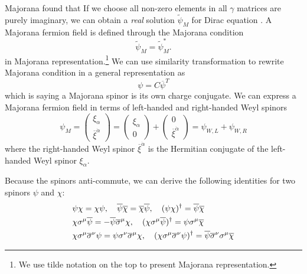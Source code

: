 \documentclass[12pt]{report}
\begin{document}
Majorana found that If we choose all non-zero elements in all $\gamma$ matrices are purely imaginary, we can obtain a \textit{real} solution $\widetilde{\psi}_{M}$ for Dirac equation \cite{majorana}.
A Majorana fermion field is defined through the Majorana condition
\begin{equation}
\widetilde{\psi}_{M} = \widetilde{\psi}^{*}_{M} .
\end{equation}
in Majorana representation.\footnote{We use tilde notation on the top to present Majorana representation.}
We can use similarity transformation to rewrite Majorana condition in a general representation as
\begin{equation}
\psi = C \overline{\psi}^{T}
\end{equation}
which is saying a Majorana spinor is its own charge conjugate.
We can express a Majorana fermion field in terms of left-handed and right-handed Weyl spinors
\begin{equation}
\psi_{M} = \left( \begin{array}{c} \xi_{\alpha}\\ \overline{\xi}^{\dot{\alpha}} \end{array} \right) = \left( \begin{array}{c} \xi_{\alpha}\\0\end{array} \right) + \left( \begin{array}{c}0\\ \overline{\xi}^{\dot{\alpha}} \end{array} \right) = \psi_{W, L} + \psi_{W, R}
\end{equation}
where the right-handed Weyl spinor $\overline{\xi}^{\dot{\alpha}}$ is the Hermitian conjugate of the left-handed Weyl spinor $\xi_{\alpha}$.

Because the spinors anti-commute, we can derive the following identities for two spinors $\psi$ and $\chi$:
\begin{align}
& \psi \chi = \chi \psi, \quad 
\overline{\psi} \overline{\chi} = \overline{\chi} \overline{\psi}, \quad 
(\psi \chi)^{\dagger} = \overline{\psi} \overline{\chi} \notag \\
& \chi \sigma^{\mu} \overline{\psi} = - \overline{\psi} \overline{\sigma}^{\mu} \chi, \quad 
(\chi \sigma^{\mu} \overline{\psi})^{\dagger} = \psi \sigma^{\mu} \overline{\chi} \notag \\
& \chi \sigma^{\mu} \overline{\sigma}^{\nu} \psi = \psi \sigma^{\nu} \overline{\sigma}^{\mu} \chi, \quad 
(\chi \sigma^{\mu} \overline{\sigma}^{\nu} \psi)^{\dagger} = \overline{\psi} \overline{\sigma}^{\nu} \sigma^{\mu} \overline{\chi}
\end{align}
\end{document}
